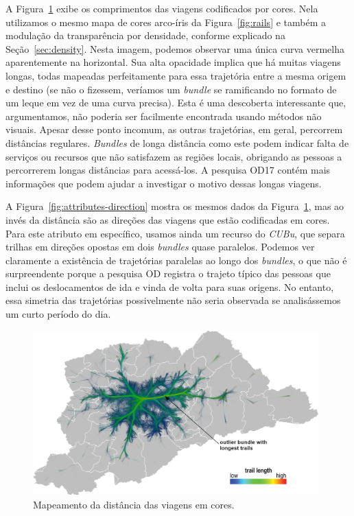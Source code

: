 A Figura~\ref{fig:attributes-length} exibe os comprimentos das viagens
codificados por cores. Nela utilizamos o mesmo mapa de cores arco-íris da
Figura~\ref{fig:rails} e também a modulação da transparência por densidade,
conforme explicado na Seção~\ref{sec:density}. Nesta imagem, podemos observar
uma única curva vermelha aparentemente na horizontal. Sua alta opacidade implica
que há muitas viagens longas, todas mapeadas perfeitamente para essa trajetória
entre a mesma origem e destino (se não o fizessem, veríamos um \emph{bundle} se
ramificando no formato de um leque em vez de uma curva precisa). Esta é uma
descoberta interessante que, argumentamos, não poderia ser facilmente encontrada
usando métodos não visuais. Apesar desse ponto incomum, as outras trajetórias,
em geral, percorrem distâncias regulares. \emph{Bundles} de longa distância como
este podem indicar falta de serviços ou recursos que não satisfazem as regiões
locais, obrigando as pessoas a percorrerem longas distâncias para acessá-los. A
pesquisa OD17 contém mais informações que podem ajudar a investigar o motivo
dessas longas viagens.

A Figura~\ref{fig:attributes-direction} mostra os mesmos dados da
Figura~\ref{fig:attributes-length}, mas ao invés da distância são as direções
das viagens que estão codificadas em cores. Para este atributo em específico,
usamos ainda um recurso do \emph{CUBu}, que separa trilhas em direções opostas
em dois \emph{bundles} quase paralelos. Podemos ver claramente a existência de
trajetórias paralelas ao longo dos \emph{bundles}, o que não é surpreendente
porque a pesquisa OD registra o trajeto típico das pessoas que inclui os
deslocamentos de ida e vinda de volta para suas origens. No entanto, essa
simetria das trajetórias possivelmente não seria observada se analisássemos um
curto período do dia.

\begin{figure}[!htb] \centering \captionsetup{justification=centering}
  \includegraphics[width=0.98\textwidth]{../figuras/distances.png}
  \caption{Mapeamento da distância das viagens em cores. \label{fig:attributes-length}}
  \end{figure}

